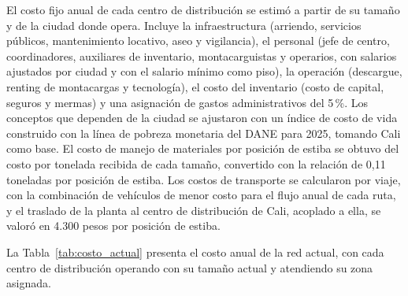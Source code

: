 \documentclass[fleqn, 11pt,letterpaper]{article}
\begin{document}
El costo fijo anual de cada centro de distribución se estimó a partir de su tamaño y de la ciudad donde opera. Incluye la infraestructura (arriendo, servicios públicos, mantenimiento locativo, aseo y vigilancia), el personal (jefe de centro, coordinadores, auxiliares de inventario, montacarguistas y operarios, con salarios ajustados por ciudad y con el salario mínimo como piso), la operación (descargue, renting de montacargas y tecnología), el costo del inventario (costo de capital, seguros y mermas) y una asignación de gastos administrativos del 5\,\%. Los conceptos que dependen de la ciudad se ajustaron con un índice de costo de vida construido con la línea de pobreza monetaria del DANE para 2025, tomando Cali como base. El costo de manejo de materiales por posición de estiba se obtuvo del costo por tonelada recibida de cada tamaño, convertido con la relación de 0,11 toneladas por posición de estiba. Los costos de transporte se calcularon por viaje, con la combinación de vehículos de menor costo para el flujo anual de cada ruta, y el traslado de la planta al centro de distribución de Cali, acoplado a ella, se valoró en 4.300 pesos por posición de estiba.

La Tabla~\ref{tab:costo_actual} presenta el costo anual de la red actual, con cada centro de distribución operando con su tamaño actual y atendiendo su zona asignada.
\end{document}
